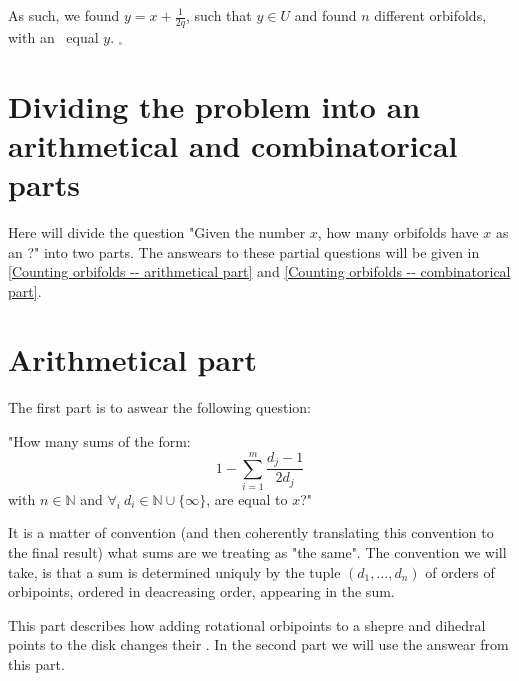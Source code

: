 As such, we found $y = x + \frac{1}{2q}$, such that $y \in U$ and 
found $n$
different orbifolds, with an \Eoc\ equal $y$. $_\square$ 
 



\section{Dividing the problem into an arithmetical and combinatorical parts}
\label{dividing the problem}
Here will divide the question "Given the number $x$, how many orbifolds have $x$ as an \Eoc?" 
into two parts. The answears to these partial questions will be given in 
\ref{Counting orbifolds -- arithmetical part} and 
\ref{Counting orbifolds -- combinatorical part}.   
\section{Arithmetical part}\label{arithmetical part}
The first part is to aswear the following question:

"How many sums of the form:
\begin{equation}\label{counting D2}
1-\sum_{i=1}^m \frac{d_j-1}{2d_j} 
\end{equation} 
with $n\in \mathbb{N}$ and $\forall_i\ d_i\in\mathbb{N}\cup\{\infty\}$, are equal to $x$?"

It is a matter of convention (and then coherently translating this convention to the final result) 
what sums are we treating as "the same". The convention we will take, is that a sum is determined 
uniquly by the tuple $(d_1,\dots,d_n)$ 
of orders 
of orbipoints, ordered in deacreasing order, appearing in the sum. 

This part describes how adding rotational orbipoints to a shepre and dihedral points 
to the disk changes their \Eoc. 
In the second part we will use the answear from this part.
